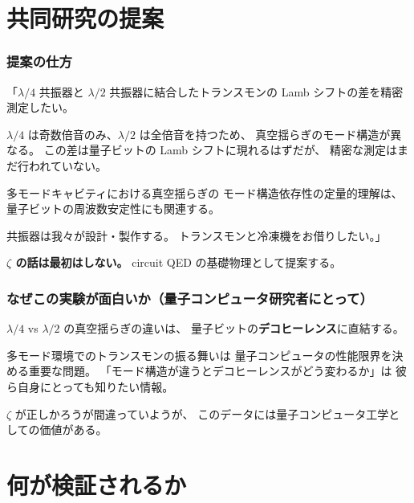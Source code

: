 \documentclass[12pt,a4paper]{article}
\begin{document}
\part{共同研究の提案}

\section{提案の仕方}

\begin{expbox}[提案テンプレート]
「$\lambda/4$ 共振器と $\lambda/2$ 共振器に結合したトランスモンの
Lamb シフトの差を精密測定したい。

$\lambda/4$ は奇数倍音のみ、$\lambda/2$ は全倍音を持つため、
真空揺らぎのモード構造が異なる。
この差は量子ビットの Lamb シフトに現れるはずだが、
精密な測定はまだ行われていない。

多モードキャビティにおける真空揺らぎの
モード構造依存性の定量的理解は、
量子ビットの周波数安定性にも関連する。

共振器は我々が設計・製作する。
トランスモンと冷凍機をお借りしたい。」

\textbf{$\zeta$ の話は最初はしない。}
circuit QED の基礎物理として提案する。
\end{expbox}

\section{なぜこの実験が面白いか（量子コンピュータ研究者にとって）}

\begin{storybox}[研究者の動機]
$\lambda/4$ vs $\lambda/2$ の真空揺らぎの違いは、
量子ビットの\textbf{デコヒーレンス}に直結する。

多モード環境でのトランスモンの振る舞いは
量子コンピュータの性能限界を決める重要な問題。
「モード構造が違うとデコヒーレンスがどう変わるか」は
彼ら自身にとっても知りたい情報。

$\zeta$ が正しかろうが間違っていようが、
このデータには量子コンピュータ工学としての価値がある。
\end{storybox}

\part{何が検証されるか}
\end{document}
